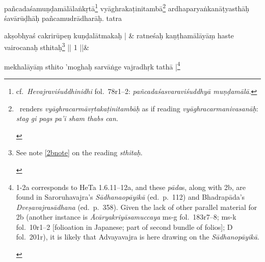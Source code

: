 \documentclass[naipra.tex]{subfiles}
\begin{document}
\begin{sanskrit}
{	
}pañcadaśamuṇḍamālālaṅkṛtā\footnote{
	cf.\ \emph{Hevajraviśuddhinidhi} fol.\ 78r1–2: \emph{pañcadaśasvaraviśuddhyā muṇḍamālā}.
} vyāghrakaṭinitambā\footnote{
	\begin{english}%
		\TIB\ renders \emph{vyāghracarmāvṛtakaṭinitambāḥ} as if reading \emph{vyāghracarmanivasanāḥ}: \emph{stag gi pags pa'i sham thabs can}.
	\end{english}
} ardhaparyaṅkanāṭyasthāḥ śavārūḍhāḥ pañcamudrādharāḥ. tatra\Emdash
\pend


\medskip\versequote
akṣobhyaś cakrirūpeṇ kuṇḍalātmakaḥ | &
ratneśaḥ kaṇṭhamālāyāṃ haste vairocanaḥ sthitaḥ\footnote{
	\begin{english}%
		See note \ref{2bnote} on the reading \emph{sthitaḥ}.
	\end{english}
} || 1 ||\&


\medskip\versequote
mekhalāyāṃ sthito 'moghaḥ sarvāṅge vajradhṛk tathā |\footnote{
	\begin{english}%
		1-2a corresponds to HeTa 1.6.11–12a, and these \emph{pāda}s, along with 2b, are found in Saroruhavajra's \emph{Sādhanaopāyikā} (ed.\ p.\ 112) and Bhadrapāda's \emph{Dveṣavajrasādhana} (ed.\ p.\ 358).
		Given the lack of other parallel material for 2b (another instance is \emph{Ācāryakriyāsamuccaya} ms-g fol.\ 183r7–8; ms-k fol.\ 10r1–2 [folioation in Japanese; part of second bundle of folios]; D fol.\ 201r), it is likely that Advayavajra is here drawing on the \emph{Sādhanopāyikā}.
	

\end{english}}
\end{sanskrit}
\end{document}
